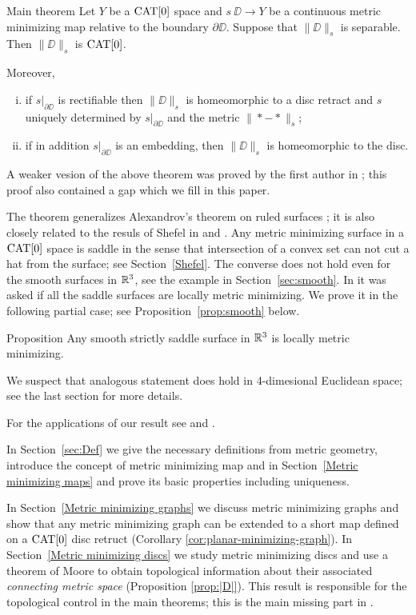 \documentclass{article}
\begin{document}
\begin{thm}{Main theorem}\label{thm:mainintro}
Let $Y$ be a $\mathop{\rm CAT}\nolimits[0]$ space 
and $s\:\DD\to Y$ be a continuous metric minimizing map relative to the boundary $\partial\DD$.
Suppose that $\|\DD\|_s$  is separable. 
Then $\|\DD\|_s$ is $\mathop{\rm CAT}\nolimits[0]$.

Moreover, 
\begin{enumerate}[(i)]
\item if $s|_{\partial\DD}$ is rectifiable then $\|\DD\|_s$ is homeomorphic to a disc retract
and $s$ uniquely determined by $s|_{\partial\DD}$ and the metric $\|{*}-{*}\|_s$;
\item if in addition $s|_{\partial\DD}$ is an embedding, then $\|\DD\|_s$ is homeomorphic to the disc.
\end{enumerate}
\end{thm}

A weaker vesion of the above theorem was proved by the first author in \cite{petrunin-metric-min};
this proof also contained a gap which we fill in this paper.

The theorem generalizes Alexandrov's theorem on ruled surfaces \cite{A};
it is also closely related to the resuls of Shefel in \cite{shefel-2D} and \cite{shefel-3D}. 
Any metric minimizing surface in a $\mathop{\rm CAT}\nolimits[0]$ space is saddle 
in the sense that intersection of a convex set can not cut a hat from the surface;
see Section~\ref{Shefel}.
The converse does not hold even for the smooth surfaces in $\mathbb{R}^3$, see the example in Section~\ref{sec:smooth}.
In \cite{petrunin-metric-min} it was asked if all the saddle surfaces are locally metric minimizing.
We prove it in the following partial case; 
see Proposition~\ref{prop:smooth} below. 

\begin{thm}{Proposition}
Any smooth strictly saddle surface in $\mathbb{R}^3$ is locally metric minimizing. 
\end{thm}

We suspect that analogous statement does hold in 4-dimesional Euclidean space;
see the last section for more details.

For the applications of our result see \cite{LSW} and \cite{St}.

In Section~\ref{sec:Def} we give the necessary definitions from metric geometry, introduce the concept of metric minimizing map
and in Section~\ref{Metric minimizing maps} and prove its basic properties including uniqueness. 

In Section~\ref{Metric minimizing graphs}
we discuss metric minimizing graphs and show that any metric minimizing graph can be extended to a short
map defined on a $\mathop{\rm CAT}\nolimits[0]$ disc retruct (Corollary \ref{cor:planar-minimizing-graph}). 
In Section~\ref{Metric minimizing discs} we study metric minimizing discs and use a theorem of Moore \cite{moore} to obtain topological information about  their associated \emph{connecting metric space} (Proposition \ref{prop:|D|}). 
This result is responsible for 
the topological control in the main theorems;
this is the main missing part in \cite{petrunin-metric-min}. 
\end{document}
